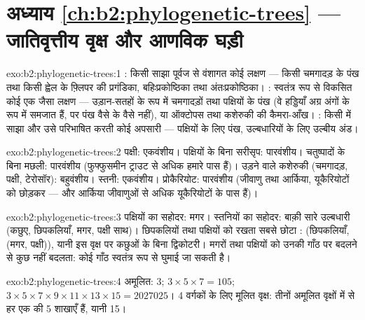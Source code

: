 \section*{अध्याय \ref{ch:b2:phylogenetic-trees} --- जातिवृत्तीय वृक्ष और आणविक घड़ी}

\begin{solution}{exo:b2:phylogenetic-trees:1}
: किसी साझा पूर्वज से वंशागत कोई लक्षण --- किसी
चमगादड़ के पंख तथा किसी ह्वेल के फ़्लिपर की प्रगंडिका, बहिःप्रकोष्ठिका तथा अंतःप्रकोष्ठिका।
: स्वतंत्र रूप से विकसित कोई एक जैसा लक्षण --- उड़ान-सतहों के रूप में
चमगादड़ों तथा पक्षियों के पंख (वे हड्डियाँ अग्र अंगों के रूप में समजात हैं,
पर पंख वैसे के वैसे नहीं), या ऑक्टोपस तथा
कशेरुकी की कैमरा-आँख। : किसी  में साझा और उसे परिभाषित करती
कोई अपसारी  --- पक्षियों के लिए पंख, उल्बधारियों के लिए
उल्बीय अंड।
\end{solution}

\begin{solution}{exo:b2:phylogenetic-trees:2}
पक्षी: एकवंशीय। पक्षियों के बिना सरीसृप: पारवंशीय। चतुष्पादों के बिना
मछली: पारवंशीय (फुफ्फुसमीन ट्राउट से अधिक हमारे पास हैं)।
उड़ने वाले कशेरुकी (चमगादड़, पक्षी, टेरोसॉर): बहुवंशीय।
स्तनी: एकवंशीय। प्रोकैरियोट: पारवंशीय (जीवाणु तथा
आर्किया, यूकैरियोटों को छोड़कर --- और आर्किया जीवाणुओं से अधिक
यूकैरियोटों के पास हैं)।
\end{solution}

\begin{solution}{exo:b2:phylogenetic-trees:3}
पक्षियों का सहोदर: मगर। स्तनियों का सहोदर: बाक़ी सारे
उल्बधारी (कछुए, छिपकलियाँ, मगर, पक्षी साथ)। छिपकलियों तथा पक्षियों को
रखता सबसे छोटा : (छिपकलियाँ,(मगर, पक्षी)),
यानी इस वृक्ष पर कछुओं के बिना द्विकोटरी। मगरों तथा
पक्षियों को उनकी गाँठ पर बदलने से कुछ नहीं बदलता: कोई गाँठ स्वतंत्र रूप से घुमाई जा सकती है।
\end{solution}

\begin{solution}{exo:b2:phylogenetic-trees:4}
अमूलित: $3$; $3\times 5\times 7 = 105$; $3\times 5\times
7\times 9\times 11\times 13\times 15 = \num{2027025}$। 4 वर्गकों के लिए
मूलित वृक्ष: तीनों अमूलित वृक्षों में से हर एक की 5 शाखाएँ हैं, यानी 15।
\end{solution}

